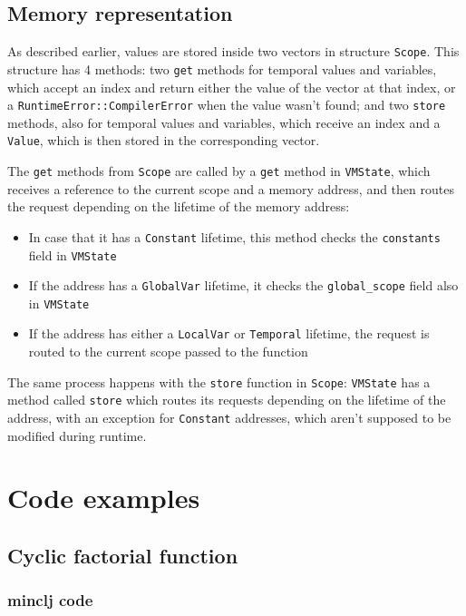 \documentclass[11pt]{scrreprt}
\begin{document}
\section{Memory representation}
As described earlier, values are stored inside two vectors in structure \texttt{Scope}. This structure has 4 methods: two \texttt{get} methods for temporal values and variables, which accept an index and return either the value of the vector at that index, or a \texttt{RuntimeError::CompilerError} when the value wasn't found; and two \texttt{store} methods, also for temporal values and variables, which receive an index and a \texttt{Value}, which is then stored in the corresponding vector.

The \texttt{get} methods from \texttt{Scope} are called by a \texttt{get} method in \texttt{VMState}, which receives a reference to the current scope and a memory address, and then routes the request depending on the lifetime of the memory address:
\begin{itemize}
  \item In case that it has a \texttt{Constant} lifetime, this method checks the \texttt{constants} field in \texttt{VMState}
  \item If the address has a \texttt{GlobalVar} lifetime, it checks the \texttt{global\_scope} field also in \texttt{VMState}
  \item If the address has either a \texttt{LocalVar} or \texttt{Temporal} lifetime, the request is routed to the current scope passed to the function
\end{itemize}

The same process happens with the \texttt{store} function in \texttt{Scope}: \texttt{VMState} has a method called \texttt{store} which routes its requests depending on the lifetime of the address, with an exception for \texttt{Constant} addresses, which aren't supposed to be modified during runtime.


\chapter{Code examples}

\section{Cyclic factorial function}
\subsection{minclj code}
\inputminted{clojure}{/home/mario/git/MarioJim/miniclj/examples/cyclic_factorial.clj}
\end{document}
